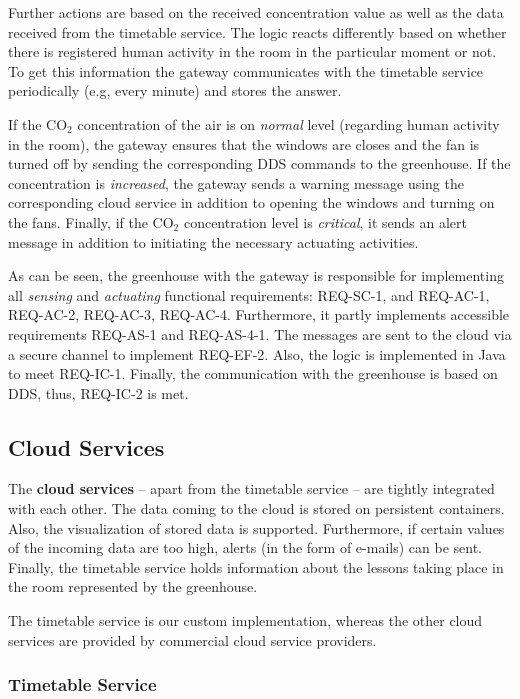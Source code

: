 \documentclass[a4paper, 11pt]{article}
\begin{document}
	Further actions are based on the received concentration value as well as the data received from the timetable service. The logic reacts differently based on whether there is registered human activity in the room in the particular moment or not. To get this information the gateway communicates with the timetable service periodically (e.g, every minute) and stores the answer.
	
	If the CO$_2$ concentration of the air is on \emph{normal} level (regarding human activity in the room), the gateway ensures that the windows are closes and the fan is turned off by sending the corresponding DDS commands to the greenhouse. If the concentration is \emph{increased}, the gateway sends a warning message using the corresponding cloud service in addition to opening the windows and turning on the fans. Finally, if the CO$_2$ concentration level is \emph{critical}, it sends an alert message in addition to initiating the necessary actuating activities.
		
	As can be seen, the greenhouse with the gateway is responsible for implementing all \textsl{sensing} and \textsl{actuating} functional requirements: REQ-SC-1, and REQ-AC-1, REQ-AC-2, REQ-AC-3, REQ-AC-4. Furthermore, it partly implements accessible requirements REQ-AS-1 and REQ-AS-4-1. The messages are sent to the cloud via a secure channel to implement REQ-EF-2. Also, the logic is implemented in Java to meet REQ-IC-1. Finally, the communication with the greenhouse is based on DDS, thus, REQ-IC-2 is met.
	
	\subsection{Cloud Services}
	The \textbf{cloud services} -- apart from the timetable service -- are tightly integrated with each other. The data coming to the cloud is stored on persistent containers. Also, the visualization of stored data is supported. Furthermore, if certain values of the incoming data are too high, alerts (in the form of e-mails) can be sent. Finally, the timetable service holds information about the lessons taking place in the room represented by the greenhouse.
	
	The timetable service is our custom implementation, whereas the other cloud services are provided by commercial cloud service providers.
	
	\subsubsection{Timetable Service}
	
\end{document}

